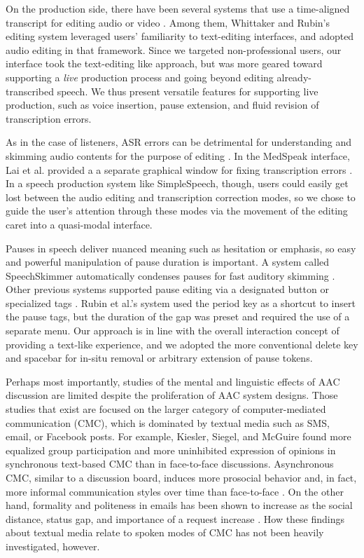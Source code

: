 On the production side, there have been several systems that use a time-aligned transcript for editing audio \cite{rubin,whittaker_semantic,yoon} or video \cite{Berthouzoz:2012,casares}. 
Among them, Whittaker and Rubin's editing system leveraged users' familiarity to text-editing interfaces, and adopted audio editing in that framework. 
Since we targeted non-professional users, our interface took the text-editing like approach, but was more geared toward supporting a \emph{live} production process and going beyond editing already-transcribed speech. 
We thus present versatile features for supporting live production, such as voice insertion, pause extension, and fluid revision of transcription errors.

As in the case of listeners, ASR errors can be detrimental for understanding and skimming audio contents for the purpose of editing \cite{halverson1999beauty}. 
In the MedSpeak interface, Lai et al. provided a a separate graphical window for fixing transcription errors \cite{Lai:1997}. 
In a speech production system like SimpleSpeech, though, users could easily get lost between the audio editing and transcription correction modes, so we chose to guide the user's attention through these modes via the movement of the editing caret into a quasi-modal interface.

Pauses in speech deliver nuanced meaning such as hesitation or emphasis, so easy and powerful manipulation of pause duration is important. 
A system called SpeechSkimmer automatically condenses pauses for fast auditory skimming \cite{arons:1993}. 
Other previous systems supported pause editing via a designated button \cite{Berthouzoz:2012} or specialized tags \cite{rubin}. 
Rubin et al.'s system used the period key as a shortcut to insert the pause tags, but the duration of the gap was preset and required the use of a separate menu. 
Our approach is in line with the overall interaction concept of providing a text-like experience, and we adopted the more conventional delete key and spacebar for in-situ removal or arbitrary extension of pause tokens.

Perhaps most importantly, studies of the mental and linguistic effects of AAC discussion are limited despite the proliferation of AAC system designs.
Those studies that exist are focused on the larger category of computer-mediated communication (CMC), which is dominated by textual media such as SMS, email, or Facebook posts.
For example, Kiesler, Siegel, and McGuire \cite{kiesler} found more equalized group participation and more uninhibited expression of opinions in synchronous text-based CMC than in face-to-face discussions.
Asynchronous CMC, similar to a discussion board, induces more prosocial behavior and, in fact, more informal communication styles over time than face-to-face \cite{walther}.
On the other hand, formality and politeness in emails has been shown to increase as the social distance, status gap, and importance of a request increase \cite{cho}.
How these findings about textual media relate to spoken modes of CMC has not been heavily investigated, however.